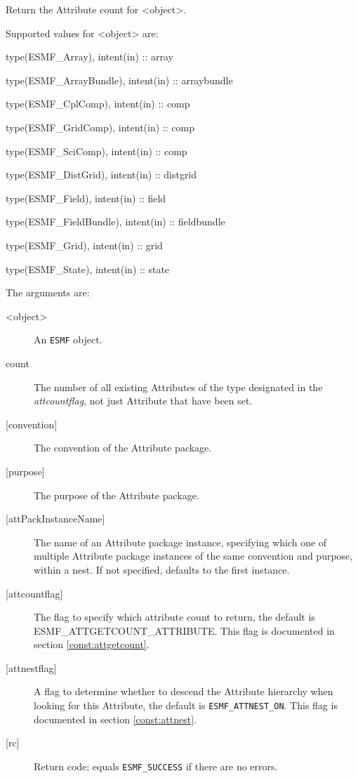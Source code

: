    Return the Attribute count for <object>.
  
   Supported values for <object> are:
   \begin{description}
   \item type(ESMF\_Array), intent(in) :: array
   \item type(ESMF\_ArrayBundle), intent(in) :: arraybundle
   \item type(ESMF\_CplComp), intent(in) :: comp
   \item type(ESMF\_GridComp), intent(in) :: comp
   \item type(ESMF\_SciComp), intent(in) :: comp
   \item type(ESMF\_DistGrid), intent(in) :: distgrid
   \item type(ESMF\_Field), intent(in) :: field
   \item type(ESMF\_FieldBundle), intent(in) :: fieldbundle
   \item type(ESMF\_Grid), intent(in) :: grid
   \item type(ESMF\_State), intent(in) :: state
   \end{description}
  
   The arguments are:
   \begin{description}
   \item [<object>]
   An {\tt ESMF} object.
   \item [count]
   The number of all existing Attributes of the type designated in the
   {\it attcountflag}, not just Attribute that have been set.
   \item [{[convention]}]
   The convention of the Attribute package.
   \item [{[purpose]}]
   The purpose of the Attribute package.
   \item [{[attPackInstanceName]}]
   The name of an Attribute package instance, specifying which one
   of multiple Attribute package instances of the same convention
   and purpose, within a nest. If not specified, defaults to the
   first instance.
   \item [{[attcountflag]}]
   The flag to specify which attribute count to return, the
   default is ESMF\_ATTGETCOUNT\_ATTRIBUTE. This flag is documented
   in section \ref{const:attgetcount}.
   \item [{[attnestflag]}]
   A flag to determine whether to descend the
   Attribute hierarchy when looking for this Attribute, the default
   is {\tt ESMF\_ATTNEST\_ON}. This flag is documented in section
   \ref{const:attnest}.
   \item [{[rc]}]
   Return code; equals {\tt ESMF\_SUCCESS} if there are no errors.
   \end{description}
   
